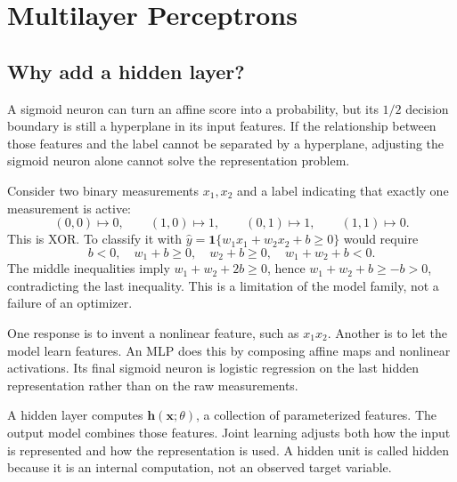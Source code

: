 \section{Multilayer Perceptrons}
\label{sec:logreg_to_mlp:multilayer_perceptrons}

\subsection{Why add a hidden layer?}
A sigmoid neuron can turn an affine score into a probability, but its $1/2$ decision boundary is still a hyperplane in its input features. If the relationship between those features and the label cannot be separated by a hyperplane, adjusting the sigmoid neuron alone cannot solve the representation problem.

Consider two binary measurements $x_1,x_2$ and a label indicating that exactly one measurement is active:
\[
 (0,0)\mapsto0,\qquad(1,0)\mapsto1,\qquad
 (0,1)\mapsto1,\qquad(1,1)\mapsto0.
\]
This is XOR. To classify it with $\hat y=\mathbf{1}\{w_1x_1+w_2x_2+b\geq0\}$ would require
\[
 b<0,\quad w_1+b\geq0,\quad w_2+b\geq0,\quad w_1+w_2+b<0.
\]
The middle inequalities imply $w_1+w_2+2b\geq0$, hence
$w_1+w_2+b\geq-b>0$, contradicting the last inequality. This is a limitation of the model family, not a failure of an optimizer.

One response is to invent a nonlinear feature, such as $x_1x_2$. Another is to let the model learn features. An MLP does this by composing affine maps and nonlinear activations. Its final sigmoid neuron is logistic regression on the last hidden representation rather than on the raw measurements.
\begin{keyidea}
A hidden layer computes $\mathbf{h}(\mathbf{x};\theta)$, a collection of parameterized features. The output model combines those features. Joint learning adjusts both how the input is represented and how the representation is used. A hidden unit is called hidden because it is an internal computation, not an observed target variable.
\end{keyidea}

